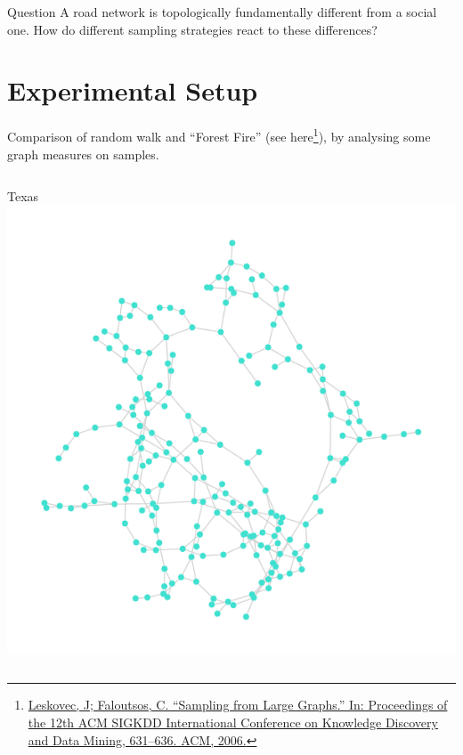 \documentclass{beamer}
\begin{document}
\begin{frame}
  \begin{block}{Question}
    A road network is topologically fundamentally different from a social one.  How do different
    sampling strategies react to these differences?
  \end{block}
\end{frame}


\section{Experimental Setup}
\begin{frame}
  Comparison of random walk and \enquote{Forest Fire} (see
  here\footnote{\protect\href{https://cs.stanford.edu/people/jure/pubs/sampling-kdd06.pdf}{Leskovec,
      J; Faloutsos, C. \enquote{Sampling from Large Graphs.} In: Proceedings of the 12th ACM SIGKDD
      International Conference on Knowledge Discovery and Data Mining, 631--636. ACM, 2006.}}), by
  analysing some graph measures on samples.  \vspace{-0.5cm}
  \begin{columns}
    \begin{column}[t]{0.5\textwidth}
      \begin{block}{Texas}
        \centering
        \includegraphics[scale=0.3]{fig/texas_rw}\par

\end{block}
\end{column}
\end{columns}
\end{frame}
\end{document}
